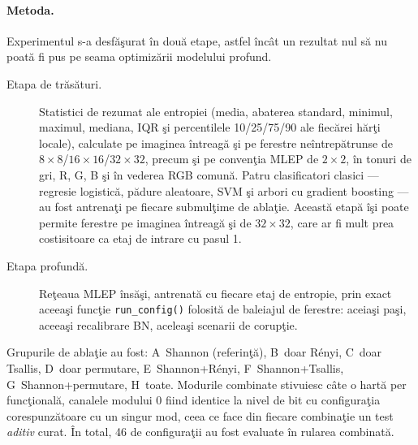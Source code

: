 \paragraph{Metoda.} Experimentul s-a desfăşurat în două etape, astfel încât un
rezultat nul să nu poată fi pus pe seama optimizării modelului profund.

\begin{description}
  \item[Etapa de trăsături.] Statistici de rezumat ale entropiei (media,
    abaterea standard, minimul, maximul, mediana, IQR şi percentilele
    10/25/75/90 ale fiecărei hărţi locale), calculate pe imaginea întreagă şi pe
    ferestre neîntrepătrunse de $8\times8$/$16\times16$/$32\times32$, precum şi
    pe convenţia MLEP de $2\times2$, în tonuri de gri, R, G, B şi în vederea RGB
    comună. Patru clasificatori clasici --- regresie logistică, pădure aleatoare,
    SVM şi arbori cu gradient boosting --- au fost antrenaţi pe fiecare submulţime
    de ablaţie. Această etapă îşi poate permite ferestre pe imaginea întreagă şi
    de $32\times32$, care ar fi mult prea costisitoare ca etaj de intrare cu
    pasul 1.
  \item[Etapa profundă.] Reţeaua MLEP însăşi, antrenată cu fiecare etaj de
    entropie, prin exact aceeaşi funcţie \texttt{run\_config()} folosită de
    baleiajul de ferestre: aceiaşi paşi, aceeaşi recalibrare BN, aceleaşi
    scenarii de corupţie.
\end{description}

Grupurile de ablaţie au fost: A~Shannon (referinţă), B~doar Rényi, C~doar
Tsallis, D~doar permutare, E~Shannon+Rényi, F~Shannon+Tsallis,
G~Shannon+permutare, H~toate. Modurile combinate stivuiesc câte o hartă per
funcţională, canalele modului 0 fiind identice la nivel de bit cu configuraţia
corespunzătoare cu un singur mod, ceea ce face din fiecare combinaţie un test
\emph{aditiv} curat. În total, 46 de configuraţii au fost evaluate în rularea
combinată.

